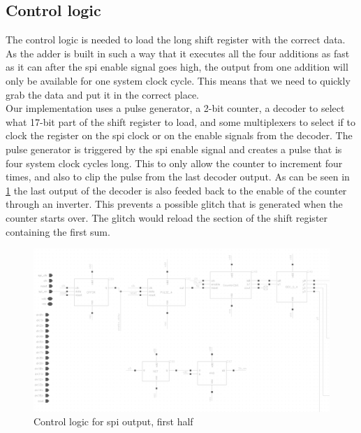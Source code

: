 \subsection{Control logic}
The control logic is needed to load the long shift register with the correct data. \\
As the adder is built in such a way that it executes all the four additions as fast as it can after the spi enable signal goes high, the output from one addition will only be available for one system clock cycle. This means that we need to quickly grab the data and put it in the correct place.\\ 
Our implementation uses a pulse generator, a 2-bit counter, a decoder to select what 17-bit part of the shift register to load, and some multiplexers to select if to clock the register on the spi clock or on the enable signals from the decoder. The pulse generator is triggered by the spi enable signal and creates a pulse that is four system clock cycles long. This to only allow the counter to increment four times, and also to clip the pulse from the last decoder output. As can be seen in \ref{spi_out1} the last output of the decoder is also feeded back to the enable of the counter through an inverter. This prevents a possible glitch that is generated when the counter starts over. The glitch would reload the section of the shift register containing the first sum. \\

\begin{figure}[H]
\centering
\captionsetup{justification=centering}
\includegraphics[scale=0.2]{../figures/spi_out1.png}
\caption{Control logic for spi output, first half}
\label{spi_out1}
\end{figure}

